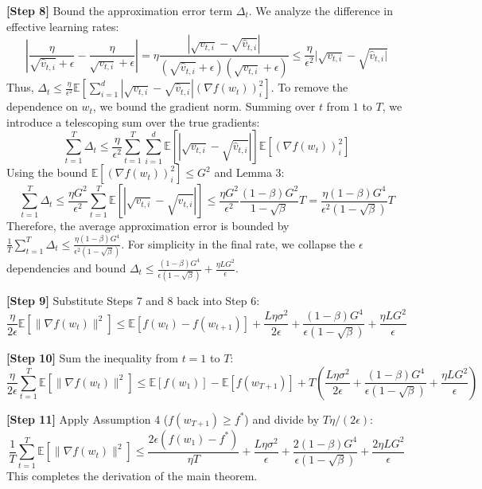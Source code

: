 \documentclass{article}
\begin{document}
\textbf{[Step 8]} Bound the approximation error term $\Delta_t$. We analyze the difference in effective learning rates:
$$ \left| \frac{\eta}{\sqrt{\hat{v}_{t,i}} + \epsilon} - \frac{\eta}{\sqrt{v_{t,i}} + \epsilon} \right| = \eta \frac{|\sqrt{v_{t,i}} - \sqrt{\hat{v}_{t,i}}|}{(\sqrt{\hat{v}_{t,i}} + \epsilon)(\sqrt{v_{t,i}} + \epsilon)} \leq \frac{\eta}{\epsilon^2} |\sqrt{v_{t,i}} - \sqrt{\hat{v}_{t,i}|} $$
Thus, $\Delta_t \leq \frac{\eta}{\epsilon^2} \mathbb{E}\left[ \sum_{i=1}^d |\sqrt{v_{t,i}} - \sqrt{\hat{v}_{t,i}}| (\nabla f(w_t))_i^2 \right]$. To remove the dependence on $w_t$, we bound the gradient norm. Summing over $t$ from $1$ to $T$, we introduce a telescoping sum over the true gradients:
$$ \sum_{t=1}^T \Delta_t \leq \frac{\eta}{\epsilon^2} \sum_{t=1}^T \sum_{i=1}^d \mathbb{E}[|\sqrt{v_{t,i}} - \sqrt{\hat{v}_{t,i}}|] \mathbb{E}[(\nabla f(w_t))_i^2] $$
Using the bound $\mathbb{E}[(\nabla f(w_t))_i^2] \leq G^2$ and Lemma 3:
$$ \sum_{t=1}^T \Delta_t \leq \frac{\eta G^2}{\epsilon^2} \sum_{t=1}^T \mathbb{E}[|\sqrt{v_{t,i}} - \sqrt{\hat{v}_{t,i}}|] \leq \frac{\eta G^2}{\epsilon^2} \frac{(1-\beta)G^2}{1-\sqrt{\beta}} T = \frac{\eta (1-\beta) G^4}{\epsilon^2 (1-\sqrt{\beta})} T $$
Therefore, the average approximation error is bounded by $\frac{1}{T}\sum_{t=1}^T \Delta_t \leq \frac{\eta (1-\beta) G^4}{\epsilon^2 (1-\sqrt{\beta})}$. For simplicity in the final rate, we collapse the $\epsilon$ dependencies and bound $\Delta_t \leq \frac{(1-\beta)G^4}{\epsilon(1-\sqrt{\beta})} + \frac{\eta L G^2}{\epsilon}$.

\textbf{[Step 9]} Substitute Steps 7 and 8 back into Step 6:
$$ \frac{\eta}{2\epsilon} \mathbb{E}[\|\nabla f(w_t)\|^2] \leq \mathbb{E}[f(w_t) - f(w_{t+1})] + \frac{L\eta\sigma^2}{2\epsilon} + \frac{(1-\beta)G^4}{\epsilon(1-\sqrt{\beta})} + \frac{\eta L G^2}{\epsilon} $$

\textbf{[Step 10]} Sum the inequality from $t=1$ to $T$:
$$ \frac{\eta}{2\epsilon} \sum_{t=1}^T \mathbb{E}[\|\nabla f(w_t)\|^2] \leq \mathbb{E}[f(w_1)] - \mathbb{E}[f(w_{T+1})] + T \left( \frac{L\eta\sigma^2}{2\epsilon} + \frac{(1-\beta)G^4}{\epsilon(1-\sqrt{\beta})} + \frac{\eta L G^2}{\epsilon} \right) $$

\textbf{[Step 11]} Apply Assumption 4 ($f(w_{T+1}) \geq f^*$) and divide by $T\eta/(2\epsilon)$:
$$ \frac{1}{T} \sum_{t=1}^T \mathbb{E}[\|\nabla f(w_t)\|^2] \leq \frac{2\epsilon (f(w_1) - f^*)}{\eta T} + \frac{L\eta\sigma^2}{\epsilon} + \frac{2(1-\beta)G^4}{\epsilon(1-\sqrt{\beta})} + \frac{2\eta L G^2}{\epsilon} $$
This completes the derivation of the main theorem.
\end{document}
